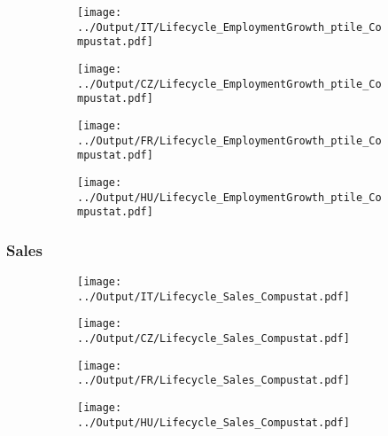 \documentclass[12pt,notitlepage]{article}
\begin{document}
\begin{figure}[!htpb]
\centering
\caption{Employment (Percentile)}
\begin{subfigure}{.49\textwidth}
    \centering
 \texttt{[image: ../Output/IT/Lifecycle\_EmploymentGrowth\_ptile\_Compustat.pdf]}
\end{subfigure}%
\begin{subfigure}{.49\textwidth}
    \centering
 \texttt{[image: ../Output/CZ/Lifecycle\_EmploymentGrowth\_ptile\_Compustat.pdf]}
\end{subfigure}
\begin{subfigure}{.49\textwidth}
    \centering
 \texttt{[image: ../Output/FR/Lifecycle\_EmploymentGrowth\_ptile\_Compustat.pdf]}
\end{subfigure}%
\begin{subfigure}{.49\textwidth}
    \centering
 \texttt{[image: ../Output/HU/Lifecycle\_EmploymentGrowth\_ptile\_Compustat.pdf]}
\end{subfigure}
\end{figure}
\pagebreak


\subsubsection{Sales}
\begin{figure}[!htpb]
\centering
\caption{Sales (Average)}
\begin{subfigure}{.49\textwidth}
    \centering
 \texttt{[image: ../Output/IT/Lifecycle\_Sales\_Compustat.pdf]}
\end{subfigure}%
\begin{subfigure}{.49\textwidth}
    \centering
 \texttt{[image: ../Output/CZ/Lifecycle\_Sales\_Compustat.pdf]}
\end{subfigure}
\begin{subfigure}{.49\textwidth}
    \centering
 \texttt{[image: ../Output/FR/Lifecycle\_Sales\_Compustat.pdf]}
\end{subfigure}%
\begin{subfigure}{.49\textwidth}
    \centering
 \texttt{[image: ../Output/HU/Lifecycle\_Sales\_Compustat.pdf]}
\end{subfigure}
\end{figure}
\pagebreak
\end{document}
